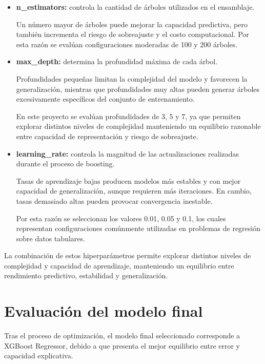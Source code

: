 \documentclass{ULBreport} %
\begin{document}
\begin{itemize}
    \item \textbf{n\_estimators:} controla la cantidad de árboles utilizados en el ensamblaje.
    
    Un número mayor de árboles puede mejorar la capacidad predictiva, pero también incrementa el riesgo de sobreajuste y el costo computacional. Por esta razón se evalúan configuraciones moderadas de 100 y 200 árboles.
    
    \item \textbf{max\_depth:} determina la profundidad máxima de cada árbol.
    
    Profundidades pequeñas limitan la complejidad del modelo y favorecen la generalización, mientras que profundidades muy altas pueden generar árboles excesivamente específicos del conjunto de entrenamiento.
    
    En este proyecto se evalúan profundidades de 3, 5 y 7, ya que permiten explorar distintos niveles de complejidad manteniendo un equilibrio razonable entre capacidad de representación y riesgo de sobreajuste.
    
    \item \textbf{learning\_rate:} controla la magnitud de las actualizaciones realizadas durante el proceso de boosting.
    
    Tasas de aprendizaje bajas producen modelos más estables y con mejor capacidad de generalización, aunque requieren más iteraciones. En cambio, tasas demasiado altas pueden provocar convergencia inestable.
    
    Por esta razón se seleccionan los valores 0.01, 0.05 y 0.1, los cuales representan configuraciones comúnmente utilizadas en problemas de regresión sobre datos tabulares.
\end{itemize}

La combinación de estos hiperparámetros permite explorar distintos niveles de complejidad y capacidad de aprendizaje, manteniendo un equilibrio entre rendimiento predictivo, estabilidad y generalización.

\section{Evaluación del modelo final}

Tras el proceso de optimización, el modelo final seleccionado corresponde a XGBoost Regressor, debido a que presenta el mejor equilibrio entre error y capacidad explicativa.
\end{document}
